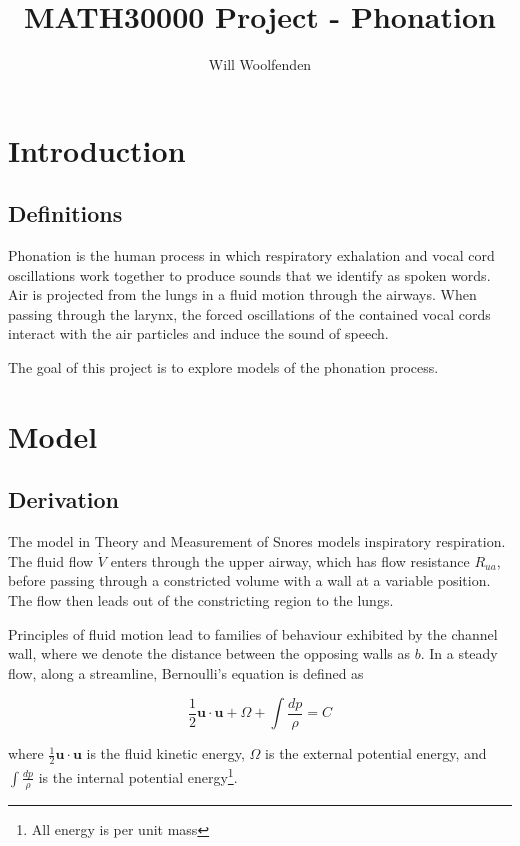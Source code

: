 \documentclass{article}
\title{MATH30000 Project - Phonation}
\author{Will Woolfenden}
\begin{document}
\maketitle

\section{Introduction}

\subsection{Definitions}

Phonation is the human process in which respiratory exhalation and vocal cord oscillations work together to produce sounds that we identify as spoken words.
Air is projected from the lungs in a fluid motion through the airways.
When passing through the larynx, the forced oscillations of the contained vocal cords interact with the air particles and induce the sound of speech.

The goal of this project is to explore models of the phonation process.



\section{Model}

\subsection{Derivation}

The model in Theory and Measurement of Snores \cite{gavriely_jensen_1993} models inspiratory respiration.
The fluid flow $\dot{V}$ enters through the upper airway, which has flow resistance $R_{ua}$,
before passing through a constricted volume with a wall at a variable position.
The flow then leads out of the constricting region to the lungs.

Principles of fluid motion lead to families of behaviour exhibited by the channel wall,
where we denote the distance between the opposing walls as $b$.
In a steady flow, along a streamline, Bernoulli's equation is defined as 

\begin{equation}
    \frac{1}{2}\mathbf{u}\cdot\mathbf{u} + \Omega + \int\frac{dp}{\rho} = C
    \label{eqn:bernoulli}
\end{equation}

where $\frac{1}{2}\mathbf{u}\cdot\mathbf{u}$ is the fluid kinetic energy, 
$\Omega$ is the external potential energy,
and $\int\frac{dp}{\rho}$ is the internal potential energy\footnote{All energy is per unit mass}.
\end{document}
